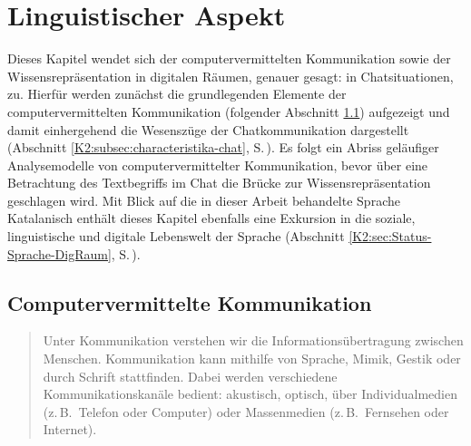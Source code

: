 


\chapter{Linguistischer Aspekt} %

\label{K2} %


Dieses Kapitel wendet sich der computervermittelten Kommunikation sowie der Wissensrepräsentation in digitalen Räumen, genauer gesagt: in Chatsituationen, zu. Hierfür werden zunächst die grundlegenden Elemente der computervermittelten Kommunikation (folgender Abschnitt \ref{K2:sec:CMC}) aufgezeigt und damit einhergehend die Wesenszüge der Chatkommunikation dargestellt (Abschnitt \ref{K2:subsec:characteristika-chat}, S.\,\pageref{K2:subsec:characteristika-chat}). Es folgt ein Abriss geläufiger Analysemodelle von computervermittelter Kommunikation, bevor über eine Betrachtung des Textbegriffs im Chat die Brücke zur Wissensrepräsentation geschlagen wird. Mit Blick auf die in dieser Arbeit behandelte Sprache Katalanisch enthält dieses Kapitel ebenfalls eine Exkursion in die soziale, linguistische und digitale Lebenswelt der Sprache (Abschnitt \ref{K2:sec:Status-Sprache-DigRaum}, S.\,\pageref{K2:sec:Status-Sprache-DigRaum}).


%
%

\section{Computervermittelte Kommunikation}
\label{K2:sec:CMC}


\begin{quote}\sloppy
    Unter Kommunikation verstehen wir die Informationsübertragung zwischen Menschen. Kommunikation kann mithilfe von Sprache, Mimik, Gestik oder durch Schrift stattfinden. Dabei werden verschiedene Kommunikationskanäle bedient: akustisch, optisch, über Individualmedien (z.\,B.\ Telefon oder Computer) oder Massenmedien (z.\,B.\ Fernsehen oder Internet). \citep[158]{trepte_medienpsychologie_2012}
\end{quote}

